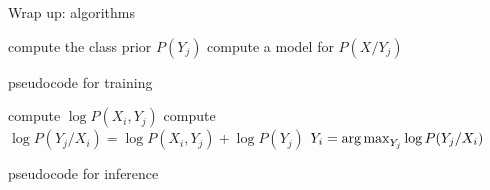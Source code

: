 \bgroup  
\begin{frame}{Wrap up: algorithms}
\begin{minipage}{0.45\textwidth}
\begin{algorithm}[H]
\begin{algorithmic}[1]
\STATE compute the class prior $P(Y_j)$
\STATE compute a model for $P(X/Y_j)$
\ENDFOR
\end{algorithmic}
\caption{pseudocode for training}
\label{alg:train}
\end{algorithm}
\end{minipage}
\begin{minipage}{0.45\textwidth}
\begin{algorithm}[H]
\begin{algorithmic}[1]
\STATE compute $\log{P(X_i, Y_j)}$
\STATE compute $\log{P(Y_j/X_i)} = \log{P(X_i, Y_j)} + \log{P(Y_j)}$
\ENDFOR
\STATE $Y_i=\operatorname*{arg\,max}_{Y_j}\log{P(Y_j/X_i)}$
\ENDFOR
\end{algorithmic}
\caption{pseudocode for inference}
\label{alg:test}
\end{algorithm}
\end{minipage}

\end{frame}
\egroup